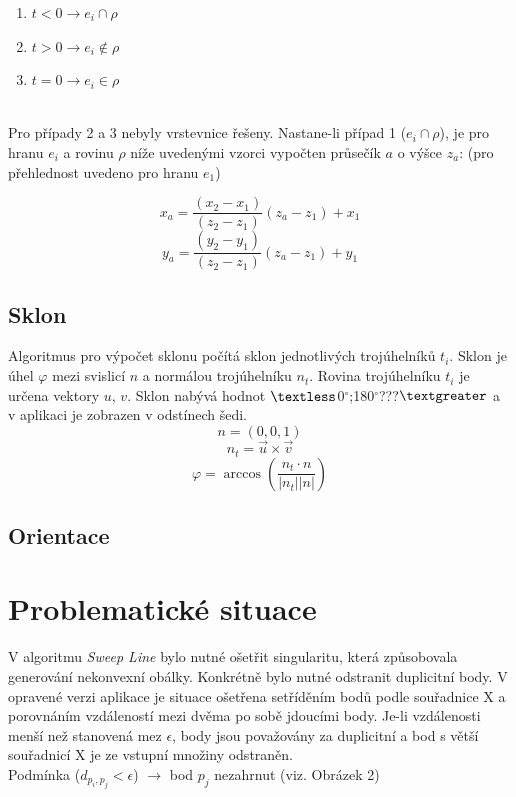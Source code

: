 \documentclass[a4paper, 12pt]{article}
\begin{document}
\begin{enumerate}
\item $t < 0 \rightarrow e_i \cap \rho$
\item $t > 0 \rightarrow e_i \notin \rho$ 
\item $t = 0 \rightarrow e_i \in \rho$
\end{enumerate}
~\\
Pro případy 2 a 3 nebyly vrstevnice řešeny. Nastane-li případ 1 ($e_i \cap \rho$), je pro hranu $e_i$ a rovinu $\rho$ níže uvedenými vzorci vypočten průsečík $a$ o výšce $z_a$: (pro přehlednost uvedeno pro hranu $e_1$)

$$ x_a = \frac{(x_2-x_1)}{(z_2-z_1)}(z_a-z_1)+x_1 $$
$$ y_a = \frac{(y_2-y_1)}{(z_2-z_1)}(z_a-z_1)+y_1 $$

\subsection{Sklon}
Algoritmus pro výpočet sklonu počítá sklon jednotlivých trojúhelníků $t_i$. Sklon je úhel $\varphi$ mezi svislicí $n$ a normálou trojúhelníku $n_t$. Rovina trojúhelníku $t_i$ je určena vektory $u$, $v$. Sklon nabývá hodnot $\textless$0$^\circ$;180$^\circ$???$\textgreater$ a v aplikaci je zobrazen v odstínech šedi.\\

$$n = (0,0,1)$$
$$n_t = \vec{u}\times \vec{v}$$
$$\varphi =\arccos\left(\frac{n_t \cdot n}{|n_t| |n|}\right)$$

\subsection{Orientace}




\section{Problematické situace}
V algoritmu \textit{Sweep Line} bylo nutné ošetřit singularitu, která způsobovala generování nekonvexní obálky. Konkrétně bylo nutné odstranit duplicitní body. V opravené verzi aplikace je situace ošetřena setříděním bodů podle souřadnice X a porovnáním vzdáleností mezi dvěma po sobě jdoucími body. Je-li vzdálenosti menší než stanovená mez $\epsilon$, body jsou považovány za duplicitní a bod s větší souřadnicí X je ze vstupní množiny odstraněn. \\

Podmínka ($d_{p_i,p_j} < \epsilon$) $\rightarrow$ bod $p_j$ nezahrnut (viz. Obrázek 2)\\
\end{document}
